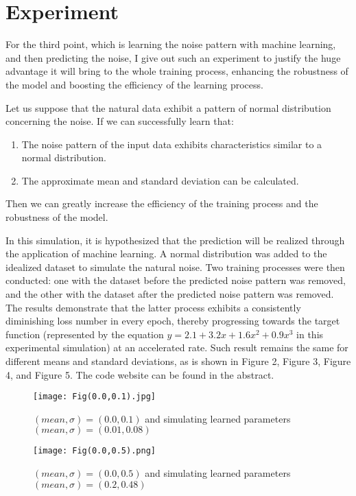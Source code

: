 \documentclass{article}
\begin{document}
\section{Experiment}

For the third point, which is learning the noise pattern with machine learning, and then predicting the noise, I give out such an experiment to justify the huge advantage it will bring to the whole training process, enhancing the robustness of the model and boosting the efficiency of the learning process.

Let us suppose that the natural data exhibit a pattern of normal distribution concerning the noise. If we can successfully learn that:

\begin{enumerate}
    \item The noise pattern of the input data exhibits characteristics similar to a normal distribution.
    \item The approximate mean and standard deviation can be calculated.
\end{enumerate}

Then we can greatly increase the efficiency of the training process and the robustness of the model.

In this simulation, it is hypothesized that the prediction will be realized through the application of machine learning. A normal distribution was added to the idealized dataset to simulate the natural noise. Two training processes were then conducted: one with the dataset before the predicted noise pattern was removed, and the other with the dataset after the predicted noise pattern was removed. The results demonstrate that the latter process exhibits a consistently diminishing loss number in every epoch, thereby progressing towards the target function (represented by the equation $y = 2.1 + 3.2x + 1.6x^2 + 0.9x^3$ in this experimental simulation) at an accelerated rate. Such result remains the same for different means and standard deviations, as is shown in Figure 2, Figure 3, Figure 4, and Figure 5. The code website can be found in the abstract.

\begin{figure}
\centering
\texttt{[image: Fig(0.0,0.1).jpg]}
\caption{\label{figure 2:}$(mean, \sigma) = (0.0, 0.1)$ and simulating learned parameters $(mean, \sigma) = (0.01, 0.08)$}
\end{figure}

\begin{figure}
\centering
\texttt{[image: Fig(0.0,0.5).png]}
\caption{\label{figure 3:}$(mean, \sigma) = (0.0, 0.5)$ and simulating learned parameters $(mean, \sigma) = (0.2, 0.48)$}
\end{figure}
\end{document}
